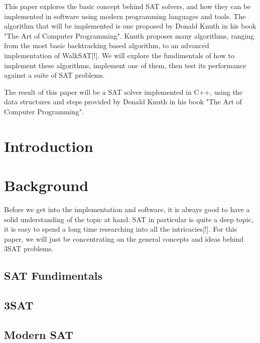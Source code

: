 \documentclass{article}
\begin{document}
This paper explores the basic concept behind SAT solvers, and how they can be implemented in
software using modern programming languages and tools. The algorithm that will be
implemented is one proposed by Donald Knuth in his book "The Art of Computer Programming". Knuth proposes
many algorithms, ranging from the most basic backtracking based algorithm, to an advanced
implementation of WalkSAT[!]. We will explore the fundimentals of how to implement these algorithms,
implement one of them, then test its performance against a suite of SAT problems.

The result of this paper will be a SAT solver implemented in C++, using the data structures and
steps provided by Donald Knuth in his book "The Art of Computer Programming".

\newpage
\tableofcontents

\newpage
\section{Introduction}
\lipsum[2-4]

\newpage
\section{Background}
Before we get into the implementation and software, it is always good to have a solid understanding
of the topic at hand. SAT in particular is quite a deep topic, it is easy to spend a long time
researching into all the intricacies[!]. For this paper, we will just be concentrating on the
general concepts and ideas behind 3SAT problems. 

\subsection{SAT Fundimentals}
\lipsum[2-4]

\subsection{3SAT}
\lipsum[2-4]

\subsection{Modern SAT}
\lipsum[2-4]
\end{document}
